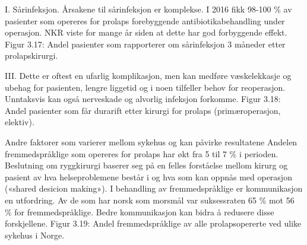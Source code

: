 \documentclass [norsk,a4paper,twoside]{article}\usepackage[]{graphicx}\usepackage[]{color}
\begin{document}
I. Sårinfeksjon.
Årsakene til sårinfeksjon er komplekse. I 2016 fikk 98-100 \% av pasienter som
opereres for prolaps forebyggende antibiotikabehandling under operasjon. NKR
viste for mange år siden at dette har god forbyggende effekt.
Figur 3.17: Andel pasienter som rapporterer om sårinfeksjon 3 måneder etter
prolapskirurgi.


III.
Dette er oftest en ufarlig komplikasjon, men kan medføre væskelekkasje og
ubehag for pasienten, lengre liggetid og i noen tilfeller behov for reoperasjon.
Unntaksvis kan også nerveskade og alvorlig infeksjon forkomme.
Figur 3.18: Andel pasienter som får durarift etter kirurgi for prolaps
(primæroperasjon, elektiv).


Andre faktorer som varierer mellom sykehus og kan påvirke resultatene
Andelen fremmedspråklige som opereres for prolaps har økt fra 5 til 7 \% i perioden.
Beslutning om ryggkirurgi baserer seg på en felles forståelse mellom kirurg og
pasient av hva helseproblemene består i og hva som kan oppnås med operasjon
(«shared desicion making»). I behandling av fremmedspråklige er kommunikasjon
en utfordring. Av de som har norsk som morsmål var suksessraten 65 \% mot 56 \%
for fremmedspråklige. Bedre kommunikasjon kan bidra å redusere disse
forskjellene.
Figur 3.19: Andel fremmedspråklige av alle prolapsopererte ved ulike sykehus i
Norge.
\end{document}
